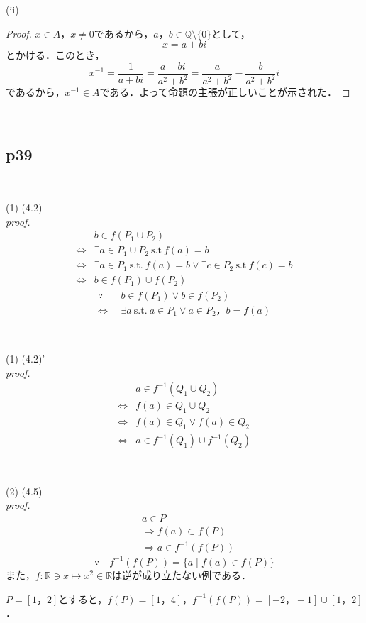 \documentclass[dvipdfmx,uplatex,11pt]{jsarticle}
\begin{document}
(ii)
\begin{leftbar}
    \begin{proof}
        $x \in A$，$x \ne 0$であるから，$a，b \in \mathbb{Q} \setminus \{0\}$として，
        \[
            x=a+bi
        \]
        とかける．このとき，
        \[
        x^{-1}=\frac{1}{a+bi}=\frac{a-bi}{a^2+b^2} = \frac{a}{a^2+b^2} - \frac{b}{a^2+b^2} i
        \]
        であるから，$x^{-1} \in A$である．よって命題の主張が正しいことが示された．
    \end{proof}
\end{leftbar}
​
\subsection{p39}
​
\begin{screen}
    (1) \quad (4.2) \\
{\it proof.}
\begin{align*}
    & b \in f(P_1 \cup P_2) \\
    \iff & \exists a \in P_1 \cup P_2 ~ \mathrm{s.t} ~ f(a)=b \\
    \iff & \exists a \in P_1 ~\mathrm{s.t.} ~ f(a)=b \lor \exists c \in P_2 ~ \mathrm{s.t} ~ f(c)=b \\
    \iff & b \in f(P_1) \cup f(P_2) 
\end{align*}
\dotfill 
\begin{align*}
\because  \quad  & b \in f(P_1) \lor b \in f(P_2) \\
\iff & \exists a ~ \mathrm{s.t.} ~ a \in P_1 \lor a \in P_2 ，b = f(a)
\end{align*}
\end{screen}
​
\begin{screen}
    (1) \quad (4.2)' \\
    {\it proof.}
\begin{align*}
    & a \in f^{-1} (Q_1 \cup Q_2) \\
    \iff & f(a) \in Q_1 \cup Q_2 \\
    \iff & f(a)  \in Q_1 \lor f(a) \in Q_2 \\
    \iff & a \in f^{-1} (Q_1) \cup f^{-1} (Q_2)
\end{align*}
\end{screen}
​
\begin{screen}
    (2) \quad (4.5) \\
    {\it proof.}
    \begin{align*}
        & a \in P \\
       & \Longrightarrow  f(a) \subset f(P) \\
       & \Longrightarrow a \in f^{-1} (f(P))
    \end{align*}
    \dotfill 
    \[
        \because \quad f^{-1} (f(P)) = \{ a \mid f(a)\in f(P)\}
        \]
    また，$f \colon \mathbb{R} \ni x \mapsto x^2 \in \mathbb{R}$は逆が成り立たない例である．\par
    $P=[1，2]$とすると，$f(P)=[1，4]$，$f^{-1}(f(P))=[-2，-1] \cup [1，2]$．
\end{screen}
\end{document}
